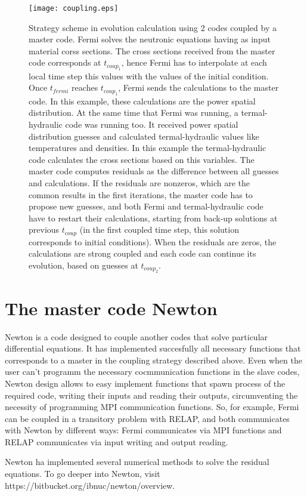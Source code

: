 \begin{figure}['ht]
\centering{}\texttt{[image: coupling.eps]}
\caption{Strategy scheme in evolution calculation using 2 codes coupled by a master code.
Fermi solves the neutronic equations having as input material corss sections.
The cross sections received from the master code corresponds at $t_{coup_1}$,
hence Fermi has to interpolate at each local time step this values with the values of the initial condition.
Once $t_{fermi}$ reaches $t_{coup_1}$, Fermi sends the calculations to the master code.
In this example, these calculations are the power spatial distribution.
At the same time that Fermi was running, a termal-hydraulic code was running too.
It received power spatial distribution guesses and calculated termal-hydraulic values like temperatures and densities.
In this example the termal-hydraulic code calculates the cross sections based on this variables.
The master code computes residuals as the difference between all guesses and calculations.
If the residuals are nonzeros, which are the common results in the first iterations, the master code has to propose new guesses,
and both Fermi and termal-hydraulic code have to restart their calculations, starting from back-up solutions at previous $t_{coup}$
(in the first coupled time step, this solution corresponds to initial conditions).
When the residuals are zeros, the calculations are strong coupled and each code can continue its evolution, based on guesses at $t_{coup_2}$.
}
\label{couplingScheme} 
\end{figure}

\section{The master code Newton}
Newton is a code designed to couple another codes that solve particular differential equations.
It has implemented succesfully all necessary functions that corresponds to a master in the coupling strategy described above.
Even when the user can't programm the necessary cocmmunication functions in the slave codes, 
Newton design allows to easy implement functions that spawn process of the required code,
writing their inputs and reading their outputs,
circumventing the necessity of programming MPI communication functions.
So, for example, Fermi can be coupled in a transitory problem with RELAP,
and both communicates with Newton by different ways:
Fermi communicates via MPI functions and RELAP communicates via input writing and output reading.

Newton ha implemented several numerical methods to solve the residual equations.
To go deeper into Newton, visit https://bitbucket.org/ibnuc/newton/overview.

